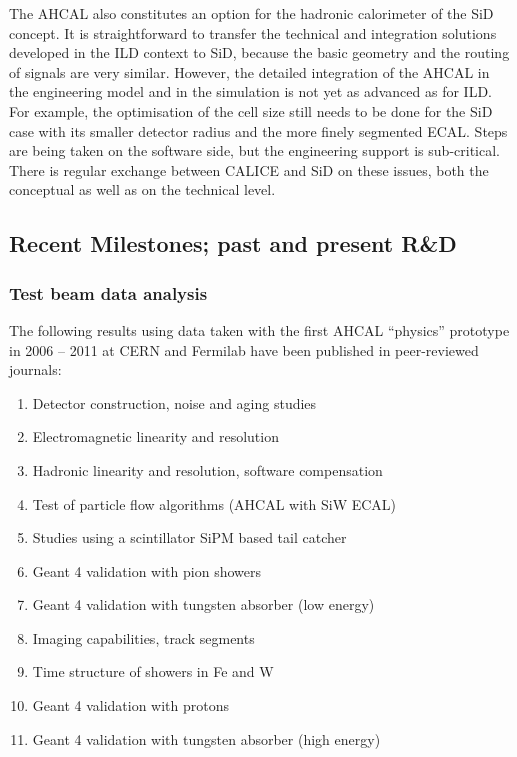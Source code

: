 The AHCAL also constitutes an option for the hadronic calorimeter of the SiD concept. It is straightforward to transfer the technical and integration solutions developed in the ILD context to SiD, because the basic geometry and the routing of signals are very similar. However, the detailed integration of the AHCAL in the engineering model and in the simulation is not yet as advanced as for ILD. For example, the optimisation of the cell size still needs to be done for the SiD case with its smaller detector radius and the more finely segmented ECAL. Steps are being taken on the software side, but the engineering support is sub-critical. There is regular exchange between CALICE and SiD on these issues, both the conceptual as well as on the technical level.

\subsection{Recent Milestones; past and present R\&D}
\subsubsection{Test beam data analysis}
The following results using data taken with the first AHCAL ``physics'' prototype in 2006 -- 2011 at CERN and Fermilab have been published in peer-reviewed journals:
\begin{enumerate}
\item Detector construction, noise and aging studies~\cite{1748-0221-5-05-P05004}
\item Electromagnetic linearity and resolution~\cite{1748-0221-6-04-P04003}
\item Hadronic linearity and resolution, software compensation~\cite{1748-0221-7-09-P09017}
\item Test of particle flow algorithms (AHCAL with SiW ECAL)~\cite{1748-0221-6-07-P07005}
\item Studies using a scintillator SiPM based tail catcher~\cite{1748-0221-7-04-P04015}
\item Geant 4 validation with pion showers~\cite{1748-0221-8-07-P07005}
\item Geant 4 validation with tungsten absorber (low energy)~\cite{1748-0221-9-01-P01004}
\item Imaging capabilities, track segments~\cite{1748-0221-8-09-P09001}
\item Time structure of showers in Fe and W~\cite{CALICE:t3bpaper}
\item Geant 4 validation with protons~\cite{Calice:proton paper}
\item Geant 4 validation with tungsten absorber (high energy)~\cite{Calice:WpaperHigh}
\end{enumerate}

